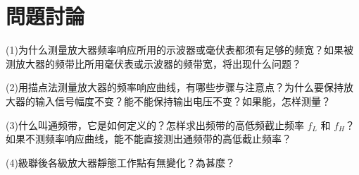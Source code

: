 \documentclass[a4paper]{article}
\begin{document}
\section{問題討論}
\hspace{2em}(1)为什么测量放大器频率响应所用的示波器或毫伏表都须有足够的频宽？如果被测放大器的频带比所用毫伏表或示波器的频带宽，将出现什么问题？\par
\hspace{2em}(2)用描点法测量放大器的频率响应曲线，有哪些步骤与注意点？为什么要保持放大器的输入信号幅度不变？能不能保持输出电压不变？如果能，怎样测量？\par
\hspace{2em}(3)什么叫通频带，它是如何定义的？怎样求出频带的高低频截止频率 $f_L$ 和 $f_H$？如果不测频率响应曲线，能不能直接测出通频带的高低截止频率？\par
\hspace{2em}(4)級聯後各級放大器靜態工作點有無變化？為甚麼？\par
\end{document}
